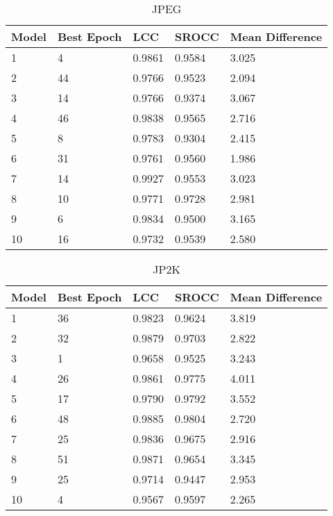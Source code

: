 \begin{table}[h]
\centering
\caption{JPEG}
\label{my-label}
\begin{tabular}{|l|l|l|l|l|}
\hline
Model & Best Epoch & LCC    & SROCC  & Mean Difference \\ \hline
1     & 4          & 0.9861 & 0.9584 & 3.025           \\ \hline
2     & 44         & 0.9766 & 0.9523 & 2.094           \\ \hline
3     & 14         & 0.9766 & 0.9374 & 3.067           \\ \hline
4     & 46         & 0.9838 & 0.9565 & 2.716           \\ \hline
5     & 8          & 0.9783 & 0.9304 & 2.415           \\ \hline
6     & 31         & 0.9761 & 0.9560 & 1.986           \\ \hline
7     & 14         & 0.9927 & 0.9553 & 3.023           \\ \hline
8     & 10         & 0.9771 & 0.9728 & 2.981           \\ \hline
9     & 6          & 0.9834 & 0.9500 & 3.165           \\ \hline
10    & 16         & 0.9732 & 0.9539 & 2.580           \\ \hline
\end{tabular}
\end{table}

\begin{table}[h]
\centering
\caption{JP2K}
\label{my-label}
\begin{tabular}{|l|l|l|l|l|}
\hline
Model & Best Epoch & LCC    & SROCC  & Mean Difference \\ \hline
1     & 36         & 0.9823 & 0.9624 & 3.819           \\ \hline
2     & 32         & 0.9879 & 0.9703 & 2.822           \\ \hline
3     & 1          & 0.9658 & 0.9525 & 3.243           \\ \hline
4     & 26         & 0.9861 & 0.9775 & 4.011           \\ \hline
5     & 17         & 0.9790 & 0.9792 & 3.552           \\ \hline
6     & 48         & 0.9885 & 0.9804 & 2.720           \\ \hline
7     & 25         & 0.9836 & 0.9675 & 2.916           \\ \hline
8     & 51         & 0.9871 & 0.9654 & 3.345           \\ \hline
9     & 25         & 0.9714 & 0.9447 & 2.953           \\ \hline
10    & 4          & 0.9567 & 0.9597 & 2.265           \\ \hline
\end{tabular}
\end{table}

